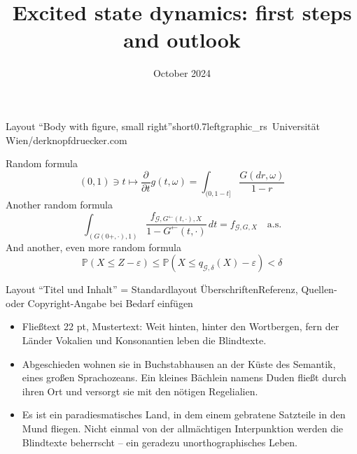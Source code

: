 \documentclass[hyperref={pdfpagelabels=false}, aspectratio=169, t]{beamer}  %
\title{Excited state dynamics: first steps and outlook}											%
\date{October 2024}              									%
\begin{document}

\maketitle
											
													




\begin{graphicsFrame}{Layout ``Body with figure, small right''}{short}{0.7}{left}{graphic_rs}{\textcopyright~Universität Wien/derknopfdruecker.com}

		Random formula
		\[
			(0,1)\ni t\mapsto\frac{\partial}{\partial t} g(t,\omega)=\int_{( 0,1-t]}\frac{G(dr,\omega)}{1-r}
		\]
		Another random formula
		\begin{equation}\label{eq1}
			\int_{( G(0+,\cdot),1)}\frac{ f_{\mathcal{G},G^{\leftarrow}(t,\cdot),X}}{1-G^{\leftarrow}(t,\cdot)}\,dt
			= f_{\mathcal{G},G,X}\quad \textrm{a.s.}
		\end{equation}
		And another, even more random formula
		\[
			\mathbb{P}(X\leq Z-\varepsilon)\leq
			\mathbb{P}(X\leq q_{\mathcal{G},\delta}(X)-\varepsilon )< \delta
		\]

\end{graphicsFrame}									

\begin{textFrame}{Layout ``Titel und Inhalt'' = Standardlayout Überschriften}{}{Referenz, Quellen- oder Copyright-Angabe bei Bedarf einfügen}

	\begin{itemize}
		\item Fließtext 22 pt, Mustertext: Weit hinten, hinter den Wortbergen, fern der Länder Vokalien und Konsonantien leben die Blindtexte.
		\item Abgeschieden wohnen sie in Buchstabhausen an der Küste des Semantik, eines großen Sprachozeans. Ein kleines Bächlein namens Duden fließt durch ihren Ort und versorgt sie mit den nötigen Regelialien.
		\item Es ist ein paradiesmatisches Land, in dem einem gebratene Satzteile in den Mund fliegen. Nicht einmal von der allmächtigen Interpunktion werden die Blindtexte beherrscht – ein geradezu unorthographisches Leben.

	\end{itemize}
\end{textFrame}
\end{document}
